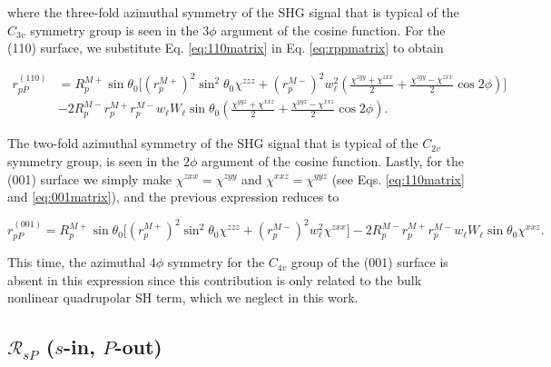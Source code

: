 \documentclass[aps,pra,10pt,amsmath,notitlepage,letterpaper]{revtex4-1}
\begin{document}
where the three-fold azimuthal symmetry of the SHG signal that is typical of the
$C_{3v}$ symmetry group is seen in the $3\phi$ argument of the cosine function.
For the (110) surface, we substitute Eq. \eqref{eq:110matrix} in Eq. 
\eqref{eq:rppmatrix} to obtain
\begin{widetext}
\begin{equation}\label{eq:rpp110}
\begin{split}
r^{(110)}_{pP} &= 
R^{M+}_{p}\sin\theta_{0}
\Bigg[
  \left(r^{M+}_{p}\right)^{2}\sin^{2}\theta_{0}\chi^{zzz}
+ \left(r^{M-}_{p}\right)^{2}w^{2}_{\ell}
\left(
\frac{\chi^{zyy} + \chi^{zxx}}{2} + \frac{\chi^{zyy} - \chi^{zxx}}{2}\cos2\phi 
\right) 
\Bigg]\\
&- 2R^{M-}_{p}r^{M+}_{p}r^{M-}_{p}w_{\ell}W_{\ell}\sin\theta_{0}
\left(
\frac{\chi^{yyz} + \chi^{xxz}}{2} + \frac{\chi^{yyz} - \chi^{xxz}}{2}\cos2\phi 
\right). 
\end{split}
\end{equation}
\end{widetext}
The two-fold azimuthal symmetry of the SHG signal that is typical of the
$C_{2v}$ symmetry group, is seen in the $2\phi$ argument of the cosine function.
Lastly, for the (001) surface we simply make $\chi^{zxx} = \chi^{zyy}$ and
$\chi^{xxz} = \chi^{yyz}$ (see Eqs. \eqref{eq:110matrix} and
\eqref{eq:001matrix}), and the previous expression reduces to
\begin{widetext}
\begin{equation}\label{rpp001}
r^{(001)}_{pP} = 
R^{M+}_{p}\sin\theta_{0}
\bigg[
  \left(r^{M+}_{p}\right)^{2}\sin^{2}\theta_{0}\chi^{zzz}
+ \left(r^{M-}_{p}\right)^{2}w^{2}_{\ell}\chi^{zxx}
\bigg]
- 2R^{M-}_{p}r^{M+}_{p}r^{M-}_{p}w_{\ell}W_{\ell}\sin\theta_{0}\chi^{xxz}.
\end{equation}
\end{widetext}
This time, the azimuthal $4\phi$ symmetry for the $C_{4v}$ group of the (001)
surface is absent in this  expression since this contribution is only related to
the bulk nonlinear quadrupolar SH term,\cite{sipePRB87} which we neglect in this
work.



\subsection{\texorpdfstring{$\mathcal{R}_{sP}$ ($s$-in, $P$-out)} {RsP (s-in,
P-out)}}
\label{sec:RsP}
\end{document}
